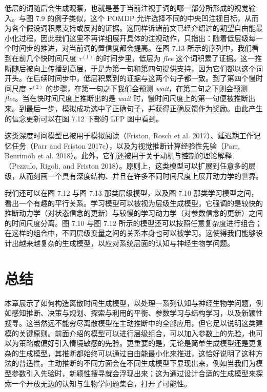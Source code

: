 低层的词随后会生成观察，也就是基于当前注视于词的哪一部分所形成的视觉输入。与图 7.9 的例子类似，这个 POMDP 允许选择不同的中央凹注视目标，从而为各个假设词积累支持或反对的证据。这同样诉诸前文已经介绍过的期望自由能最小化过程，因此我们这里不再详细展开具体的注视动作，只指出：随着低层级每一个时间步的推进，对当前词的置信度都会提高。在图 7.13 所示的序列中，我们看到在前几个快时间尺度 $\tau^{(1)}$ 的时间步里，低层为 \emph{flee} 这个词积累了证据。这一推断随后被向上传播到高层，于是为第一句和第四句提供支持，因为它们都以这个词开头。在后续时间步中，低层积累到的证据与这两个句子都一致。到了第四个慢时间尺度 $\tau^{(2)}$ 的步骤，在第一句之下我们会预测 \emph{wait}，在第二句之下则会预测 \emph{flee}。当在快时间尺度上推断出的是 \emph{wait} 时，慢时间尺度上的第一句便被推断出来。到最后一步，模拟成功选中了正确句子，并获得正确反馈作为奖励。由此产生的信念更新可以在图 7.12 下部的 LFP 图中看到。

这类深度时间模型已被用于模拟阅读（Friston, Rosch et al. 2017）、延迟期工作记忆任务（Parr and Friston 2017c），以及为视觉推断计算经验性先验（Parr, Benrimoh et al. 2018）。此外，它们还被用于关于动机与控制的理论解释（Pezzulo, Rigoli, and Friston 2018）。原则上，这类模型可以扩展到任意多的层级，从而刻画一个具有深度结构、并且在许多不同时间尺度上展开动力学的世界。

我们还可以在图 7.12 与图 7.13 那类层级模型，以及图 7.10 那类学习模型之间，看出一个有趣的平行关系。学习模型可以被视为层级生成模型，它强调的是较快的推断动力学（对状态信念的更新）与较慢的学习动力学（对参数信念的更新）之间的时间尺度分离。图 7.10 与图 7.12 所示的模型还可以按照任意复杂度进行组合；在这样的组合中，不同层级变量之间的关系本身也可以被学习。这使得我们能够设计出越来越复杂的生成模型，以应对系统层面的认知与神经生物学问题。

\section{总结}

本章展示了如何构造离散时间生成模型，以处理一系列认知与神经生物学问题，例如感知推断、决策与规划、探索与利用的平衡、参数学习与结构学习，以及新颖性搜寻。这当然远不能穷尽离散模型在主动推断中的全部应用，但它足以说明这类建模的关键原则。前面介绍的模型可以进行层级组合，可以加入参数上的先验，也可以为策略或偏好引入情境敏感的先验。更重要的是，无论是简单生成模型还是更复杂的生成模型，其推断都始终可以通过自由能最小化来推进，这恰好说明了这种方法的普适性。主动推断的不同方面会在不同生成模型下显现出来，例如当我们为模型参数引入先验时，新颖性搜寻就会浮现出来；这为通过设计合适的生成模型来探索一个开放无边的认知与生物学问题集合，打开了可能性。
